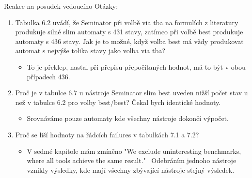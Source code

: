 \documentclass[
]{beamer}
\begin{document}
	\begin{frame}{Reakce na posudek vedoucího}		
		Otázky:
		\begin{enumerate}
			\item Tabulka 6.2 uvádí, že Seminator při volbě via tba na formulích z literatury produkuje silné slim automaty s 431 stavy, zatímco při volbě best produkuje automaty s 436 stavy. Jak je to možné, když volba best má vždy produkovat automat s nejvýše tolika stavy jako volba via tba?
			\begin{itemize}
				\item To je překlep, nastal při přepisu přepočítaných hodnot, má to být v obou případech 436.
			\end{itemize}
			\pause
			\item Proč je v tabulce 6.7 u nástroje Seminator slim best uveden nižší počet stav u než v tabulce 6.2 pro volby best/best? Čekal bych identické hodnoty.
			\begin{itemize}
				\item Srovnáváme pouze automaty kde všechny nástroje dokončí výpočet.
			\end{itemize}
			
			\pause
			\item Proč se liší hodnoty na řádcích failures v tabulkách 7.1 a 7.2?
			\begin{itemize}
				\item V sedmé kapitole mám zmíněno "We exclude uninteresting benchmarks, where all tools achieve the same result."~
				Odebráním jednoho nástroje vznikly výsledky, kde mají všechny zbývající nástroje stejný výsledek.
			\end{itemize}
			
		\end{enumerate}
		
		
	\end{frame}
	
\end{document}
